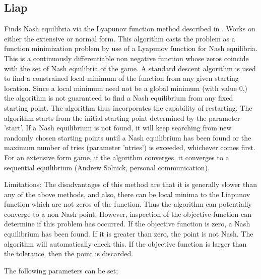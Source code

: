 \subsection{Liap}\label{Liap}
Finds Nash equilibria via the Lyapunov function method
described in \cite{McK:91}.  Works on either the extensive or normal
form.  This algorithm casts the problem as a function minimization
problem by use of a Lyapunov function for Nash equilibria.  This is a
continuously differentiable non negative function whose zeros coincide
with the set of Nash equilibria of the game.  A standard descent
algorithm is used to find a constrained local minimum of the function
from any given starting location.  Since a local minimum need not be a
global minimum (with value 0,) the algorithm is not guaranteed to find
a Nash equilibrium from any fixed starting point.  The algorithm thus
incorporates the capability of restarting.  The algorithm starts from
the initial starting point determined by the parameter 'start'.  If a
Nash equilibrium is not found, it will keep searching from new
randomly chosen starting points until a Nash equilibrium has been
found or the maximum number of tries (parameter 'ntries') is exceeded,
whichever comes first.  For an extensive form game, if the algorithm
converges, it converges to a sequential equilibrium (Andrew Solnick,
personal communication).

Limitations: The disadvantages of this method are that it is generally
slower than any of the above methods, and also,  there can be local minima
to the Liapunov function which are not zeros of the function.  Thus the
algorithm can potentially converge to a non Nash point.  However,
inspection of the objective function can determine if this problem has
occurred.  If the objective function is zero, a Nash equilibrium has been
found. If it is greater than zero, the point is not Nash.  The algorithm
will automatically check this.  If the objective function is larger than the
tolerance, then the point is discarded.

The following parameters can be set;

